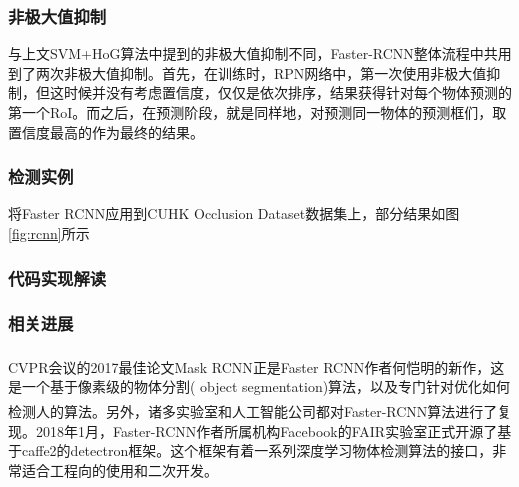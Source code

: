 \documentclass[12pt,a4paper,titlepage]{article}
\newcommand{\upcite}[1]{\textsuperscript{\textsuperscript{\cite{#1}}}}  %
\begin{document}
\subsubsection{非极大值抑制}
与上文SVM+HoG算法中提到的非极大值抑制不同，Faster-RCNN整体流程中共用到了两次非极大值抑制。首先，在训练时，RPN网络中，第一次使用非极大值抑制，但这时候并没有考虑置信度，仅仅是依次排序，结果获得针对每个物体预测的第一个RoI。而之后，在预测阶段，就是同样地，对预测同一物体的预测框们，取置信度最高的作为最终的结果。

\subsubsection{检测实例}
将Faster RCNN应用到CUHK Occlusion Dataset数据集上，部分结果如图\ref{fig:rcnn}所示

\subsubsection{代码实现解读}

\subsubsection{相关进展}
CVPR会议的2017最佳论文Mask RCNN\upcite{he2017mask}正是Faster RCNN作者何恺明的新作，这是一个基于像素级的物体分割(
object segmentation)算法，以及专门针对优化如何检测人的算法\upcite{gkioxari2017detecting}。另外，诸多实验室和人工智能公司都对Faster-RCNN算法进行了复现。2018年1月，Faster-RCNN作者所属机构Facebook的FAIR实验室正式开源了基于caffe2的detectron框架。这个框架有着一系列深度学习物体检测算法的接口，非常适合工程向的使用和二次开发。
\end{document}
